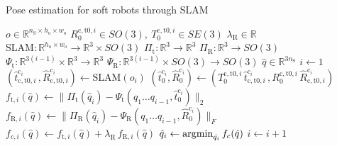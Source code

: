 \begin{algorithm}[hbt!]
\caption{Pose estimation for soft robots through SLAM}\label{alg:srslampose_estimation}
\begin{algorithmic}[1]
    \Require $o \in \mathbb{R}^{n_\mathrm{S} \times h_\mathrm{o} \times w_\mathrm{o}}$ 
    \Require $R_0^{\mathrm{c},\mathrm{t}0,i} \in SO(3), \: T_0^{\mathrm{c},\mathrm{t}0,i} \in SE(3)$ 
    \Require $\lambda_\mathrm{R} \in \mathbb{R}$ 
    \Require $\mathrm{SLAM}: \mathbb{R}^{h_\mathrm{o} \times w_\mathrm{o}} \rightarrow \mathbb{R}^{3} \times SO(3)$ 
    \Require $\Pi_\mathrm{t}: \mathbb{R}^3 \rightarrow \mathbb{R}^{3}$ 
    \Require $\Pi_\mathrm{R}: \mathbb{R}^3 \rightarrow SO(3)$ 
    \Require $\Psi_\mathrm{t}: \mathbb{R}^{3(i-1)} \times \mathbb{R}^3 \rightarrow \mathbb{R}^{3}$ 
    \Require $\Psi_\mathrm{R}: \mathbb{R}^{3(i-1)} \times SO(3) \rightarrow SO(3)$ 
    \Ensure $\hat{q} \in \mathbb{R}^{3 n_\mathrm{S}}$ 
    \State $i \gets 1$
        \vspace{0.25em}
        \State $\left ( \hat{t}_{\mathrm{c},\mathrm{t}0,i}^{\mathrm{c}_i} \, , \hat{R}_{\mathrm{c},\mathrm{t}0,i}^{\mathrm{c}_i} \right ) \gets \mathrm{SLAM}(o_i)$ 
        \vspace{0.25em}
        \State $\left ( \hat{t}_{0}^{\mathrm{c}_i}, \hat{R}_{0}^{\mathrm{c}_i} \right) \gets \left ( T_0^{\mathrm{c},\mathrm{t}0,i} \, \hat{t}_{\mathrm{c},\mathrm{t}0,i}^{\mathrm{c}_i} \, , R_0^{\mathrm{c},\mathrm{t}0,i} \, \hat{R}_{\mathrm{c},\mathrm{t}0,i}^{\mathrm{c}_i} \right )$ 
        \vspace{0.25em}
        \State $f_{\mathrm{t},i}(\hat{q}) \gets
        \big\lVert 
        \Pi_\mathrm{t}(\hat{q}_i) - \Psi_\mathrm{t}(q_1 \dots q_{i-1}, \hat{t}_{0}^{\mathrm{c}_i})
        \big\rVert_2$
        \vspace{0.25em}
        \State $f_{\mathrm{R},i}(\hat{q}) \gets
        \big\lVert 
        \Pi_\mathrm{R}(\hat{q}_i) - \Psi_\mathrm{R}(q_1 \dots q_{i-1}, \hat{R}_{0}^{\mathrm{c}_i})
        \big\rVert_F$
        \vspace{0.25em}
        \State $f_{c,i}(\hat{q}) \gets f_{\mathrm{t},i}(\hat{q}) + \lambda_\mathrm{R} \, f_{\mathrm{R},i}(\hat{q})$ 
        \vspace{0.25em}
        \State $\hat{q}_i \gets \operatorname*{\arg\!\min}_{\hat{q_i}} f_c(\hat{q})$
        \vspace{0.25em}
        \State $i \gets i + 1$
    \EndWhile
\end{algorithmic}
\end{algorithm}
